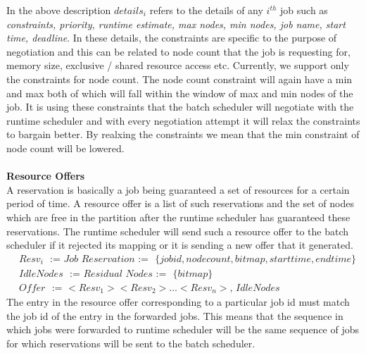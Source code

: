 In the above description $details_{i}$ refers to the details of any $i^{th}$ job such as \textit{constraints, priority, runtime estimate, max nodes, min nodes, job name, start time, deadline}. In these details, the constraints are specific to the purpose of negotiation and this can be related to node count that the job is requesting for, memory size, exclusive / shared resource access etc. Currently, we support only the constraints for node count. The node count constraint will again have a min and max both of which will fall within the window of max and min nodes of the job. It is using these constraints that the batch scheduler will negotiate with the runtime scheduler and with every negotiation attempt it will relax the constraints to bargain better. By realxing the constraints we mean that the min constraint of node count will be lowered.\\ \\
\textbf{Resource Offers}\\
A reservation is basically a job being guaranteed a set of resources for a certain period of time. A resource offer is a list of such reservations and the set of nodes which are free in the partition after the runtime scheduler has guaranteed these reservations. The runtime scheduler will send such a resource offer to the batch scheduler if it rejected its mapping or it is sending a new offer that it generated.\\
\begin{equation*}
\begin{aligned}
&Resv_{i}\ \ \ \textit{:=\ \ \ Job Reservation\ \ \ :=}\ \ \ \{jobid,node count,bitmap,start time,end time\}\\
&IdleNodes\ \ \ \textit{:=\ \ \ Residual Nodes\ \ \ :=}\ \ \ \{bitmap\}\\
&Offer\ \ \ \textit{:=\ \ \ $<Resv_{1}><Resv_{2}>...<Resv_{n}>$,\ IdleNodes}
\end{aligned}
\end{equation*}
The  entry in the resource offer corresponding to a particular job id must match the job id of the  entry in the forwarded jobs. This means that the sequence in which jobs were forwarded to runtime scheduler will be the same sequence of jobs for which reservations will be sent to the batch scheduler.\\ \\
